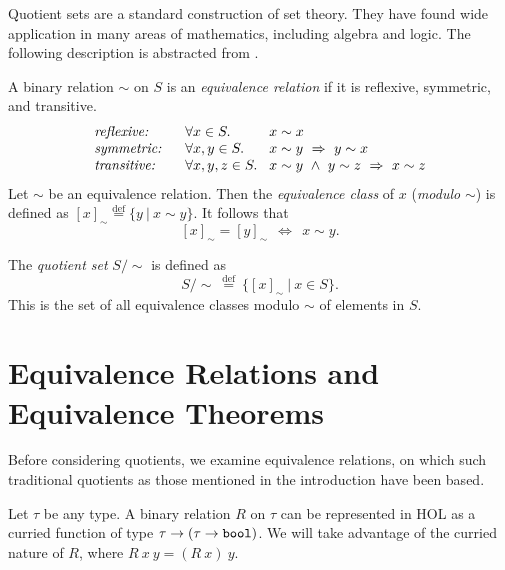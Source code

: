 \documentclass[envcountsame,runningheads]{llncs}
\def\defeq{\stackrel{\mathrm{def}}{=}}
\begin{document}
Quotient sets are a standard construction of set theory. 
They have found wide application in many areas of mathematics,
including algebra and logic.
The following description is abstracted from \cite{End77}.

A binary relation
$\sim$
on $S$ is
an {\it equivalence relation\/}
if it is reflexive, symmetric,  and transitive.
$$
\begin{array}{l@{\hspace{0.6cm}}l@{\hspace{0.3cm}}l}
\mbox{\it reflexive:} &
\forall x \in S. & x \sim x \\
\mbox{\it symmetric:} &
\forall x,y \in S. & x \sim y \ \Rightarrow \ y \sim x \\
\mbox{\it transitive:} &
\forall x,y,z \in S. & x \sim y \ \wedge \ y \sim z \ \Rightarrow \ x \sim z
\end{array}
$$
Let $\sim$ be an equivalence relation.
Then the {\it equivalence class\/} of $x$ ({\it modulo\/} $\sim$)
is defined as $[ x ]_{\sim} \defeq \{ y \ | \ x \sim y \}$.
It follows \cite{End77} that 
$$
[ x ]_{\sim} = [ y ]_{\sim} \ \ \Leftrightarrow \ \ x \sim y .
$$

\noindent
The {\it quotient set\/} $S / \mathbin{\sim}$ is defined as
$$
S / \mathbin{\sim} \ \defeq \ \{ [ x ]_{\sim} \ | \ x \in S \}.
$$
\noindent
This is the set of all equivalence classes modulo $\sim$ of elements in $S$.



%
\section{Equivalence Relations and Equivalence Theorems}
%
\label{equivalence}

%
%
Before considering quotients, we examine equivalence relations,
on which such traditional quotients as those mentioned in the introduction
have been based.

Let $\tau$ be any type.  A binary relation $R$ on $\tau$ can be
represented in HOL as a curried function
of type $\tau \rightarrow (\tau \rightarrow \mbox{\tt bool})$.
We will take advantage of the curried nature of $R$, where 
$R\ x\ y = (R\ x)\ y$.
\end{document}
